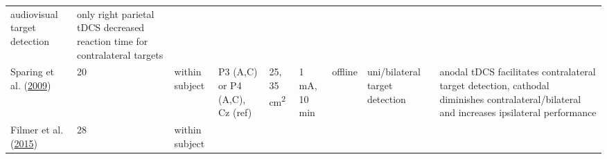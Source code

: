 \documentclass[11pt,]{memoir}
\begin{document}
\begin{longtable}[]{@{}lllllllll@{}}
\begin{minipage}[t]{0.11\columnwidth}
audiovisual target
detection\strut
\end{minipage} & \begin{minipage}[t]{0.24\columnwidth}\raggedright
only right parietal tDCS decreased reaction time for
contralateral targets\strut
\end{minipage}\tabularnewline
\begin{minipage}[t]{0.12\columnwidth}\raggedright
Sparing et al. (\protect\hyperlink{ref-Sparing2009}{2009})\strut
\end{minipage} & \begin{minipage}[t]{0.02\columnwidth}\raggedright
20\strut
\end{minipage} & \begin{minipage}[t]{0.04\columnwidth}\raggedright
within
subject\strut
\end{minipage} & \begin{minipage}[t]{0.11\columnwidth}\raggedright
P3 (A,C) or P4 (A,C), Cz
(ref)\strut
\end{minipage} & \begin{minipage}[t]{0.03\columnwidth}\raggedright
25,
35
cm\textsuperscript{2}\strut
\end{minipage} & \begin{minipage}[t]{0.05\columnwidth}\raggedright
1 mA, 10
min\strut
\end{minipage} & \begin{minipage}[t]{0.05\columnwidth}\raggedright
offline\strut
\end{minipage} & \begin{minipage}[t]{0.11\columnwidth}\raggedright
uni/bilateral target
detection\strut
\end{minipage} & \begin{minipage}[t]{0.24\columnwidth}\raggedright
anodal tDCS facilitates contralateral target detection,
cathodal diminishes contralateral/bilateral and increases
ipsilateral performance\strut
\end{minipage}\tabularnewline
\begin{minipage}[t]{0.12\columnwidth}\raggedright
Filmer et al. (\protect\hyperlink{ref-Filmer2015}{2015})\strut
\end{minipage} & \begin{minipage}[t]{0.02\columnwidth}\raggedright
28\strut
\end{minipage} & \begin{minipage}[t]{0.04\columnwidth}\raggedright
within
subject\strut
\end{minipage} & \begin{minipage}[t]{0.11\columnwidth}\raggedright

\end{minipage}
\end{longtable}
\end{document}
